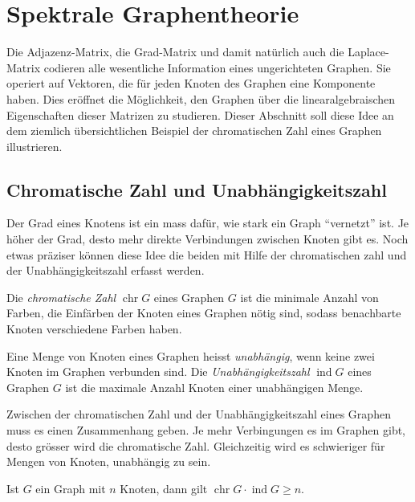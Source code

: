 %
%
%
\section{Spektrale Graphentheorie
\label{buch:section:spektrale-graphentheorie}}
Die Adjazenz-Matrix, die Grad-Matrix und damit natürlich auch
die Laplace-Matrix codieren alle wesentliche Information eines
ungerichteten Graphen.
Sie operiert auf Vektoren, die für jeden Knoten des Graphen eine
Komponente haben.
Dies eröffnet die Möglichkeit, den Graphen über die linearalgebraischen
Eigenschaften dieser Matrizen zu studieren.
Dieser Abschnitt soll diese Idee an dem ziemlich übersichtlichen Beispiel
der chromatischen Zahl eines Graphen illustrieren.

\subsection{Chromatische Zahl und Unabhängigkeitszahl
\label{buch:subsection:chromatische-zahl}}
Der Grad eines Knotens ist ein mass dafür, wie stark ein Graph
``vernetzt'' ist.
Je höher der Grad, desto mehr direkte Verbindungen zwischen Knoten gibt es.
Noch etwas präziser können diese Idee die beiden mit Hilfe der
chromatischen zahl und der Unabhängigkeitszahl erfasst werden.

\begin{definition}
Die {\em chromatische Zahl} $\operatorname{chr}G$ eines Graphen $G$ ist
die minimale Anzahl von Farben, die Einfärben der Knoten eines Graphen
nötig sind, sodass benachbarte Knoten verschiedene Farben haben.
\end{definition}

\begin{definition}
Eine Menge von Knoten eines Graphen heisst {\em unabhängig}, wenn 
keine zwei Knoten im Graphen verbunden sind.
Die {\em Unabhängigkeitszahl} $\operatorname{ind}G$ eines Graphen $G$
ist die maximale Anzahl Knoten einer unabhängigen Menge.
\end{definition}

Zwischen der chromatischen Zahl und der Unabhängigkeitszahl eines Graphen
muss es einen Zusammenhang geben.
Je mehr Verbingungen es im Graphen gibt, desto grösser wird die chromatische
Zahl.
Gleichzeitig wird es schwieriger für Mengen von Knoten, unabhängig zu sein.

\begin{satz}
\label{buch:satz:chrind}
Ist $G$ ein Graph mit $n$ Knoten, dann gilt
$\operatorname{chr}G\cdot\operatorname{ind}G\ge n$.
\end{satz}

